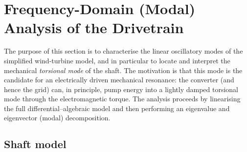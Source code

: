 
\section{Frequency-Domain (Modal) Analysis of the Drivetrain}
\label{sec:frequency-analysis}

The purpose of this section is to characterise the linear oscillatory modes of
the simplified wind-turbine model, and in particular to locate and interpret
the mechanical \emph{torsional mode} of the shaft. The motivation is that this
mode is the candidate for an electrically driven mechanical resonance: the
converter (and hence the grid) can, in principle, pump energy into a lightly
damped torsional mode through the electromagnetic torque. The analysis proceeds
by linearising the full differential--algebraic model and then performing an
eigenvalue and eigenvector (modal) decomposition.

\subsection{Shaft model}
\label{subsec:drivetrain}

